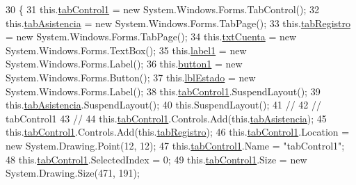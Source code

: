 \begin{DoxyCode}
30         \{
31             this.\hyperlink{class_asistencias_1_1_form1_aa2b7468a7886a62abbe1c4212612ce62}{tabControl1} = \textcolor{keyword}{new} System.Windows.Forms.TabControl();
32             this.\hyperlink{class_asistencias_1_1_form1_aa913fe8ba5b1cbb7255a471048604b41}{tabAsistencia} = \textcolor{keyword}{new} System.Windows.Forms.TabPage();
33             this.\hyperlink{class_asistencias_1_1_form1_a66b088d224d89e584af2d7109e749aab}{tabRegistro} = \textcolor{keyword}{new} System.Windows.Forms.TabPage();
34             this.\hyperlink{class_asistencias_1_1_form1_ab4dccefe2780aacefa91410f1c99e97a}{txtCuenta} = \textcolor{keyword}{new} System.Windows.Forms.TextBox();
35             this.\hyperlink{class_asistencias_1_1_form1_a9fda919b5655da27bd4911945292e3a9}{label1} = \textcolor{keyword}{new} System.Windows.Forms.Label();
36             this.\hyperlink{class_asistencias_1_1_form1_aa7f1dcbcd72919dd060d78f59b5e45be}{button1} = \textcolor{keyword}{new} System.Windows.Forms.Button();
37             this.\hyperlink{class_asistencias_1_1_form1_a4bfe2b423d729b373421b11381d9b716}{lblEstado} = \textcolor{keyword}{new} System.Windows.Forms.Label();
38             this.\hyperlink{class_asistencias_1_1_form1_aa2b7468a7886a62abbe1c4212612ce62}{tabControl1}.SuspendLayout();
39             this.\hyperlink{class_asistencias_1_1_form1_aa913fe8ba5b1cbb7255a471048604b41}{tabAsistencia}.SuspendLayout();
40             this.SuspendLayout();
41             \textcolor{comment}{// }
42             \textcolor{comment}{// tabControl1}
43             \textcolor{comment}{// }
44             this.\hyperlink{class_asistencias_1_1_form1_aa2b7468a7886a62abbe1c4212612ce62}{tabControl1}.Controls.Add(this.\hyperlink{class_asistencias_1_1_form1_aa913fe8ba5b1cbb7255a471048604b41}{tabAsistencia});
45             this.\hyperlink{class_asistencias_1_1_form1_aa2b7468a7886a62abbe1c4212612ce62}{tabControl1}.Controls.Add(this.\hyperlink{class_asistencias_1_1_form1_a66b088d224d89e584af2d7109e749aab}{tabRegistro});
46             this.\hyperlink{class_asistencias_1_1_form1_aa2b7468a7886a62abbe1c4212612ce62}{tabControl1}.Location = \textcolor{keyword}{new} System.Drawing.Point(12, 12);
47             this.\hyperlink{class_asistencias_1_1_form1_aa2b7468a7886a62abbe1c4212612ce62}{tabControl1}.Name = \textcolor{stringliteral}{"tabControl1"};
48             this.\hyperlink{class_asistencias_1_1_form1_aa2b7468a7886a62abbe1c4212612ce62}{tabControl1}.SelectedIndex = 0;
49             this.\hyperlink{class_asistencias_1_1_form1_aa2b7468a7886a62abbe1c4212612ce62}{tabControl1}.Size = \textcolor{keyword}{new} System.Drawing.Size(471, 191);

\end{DoxyCode}
